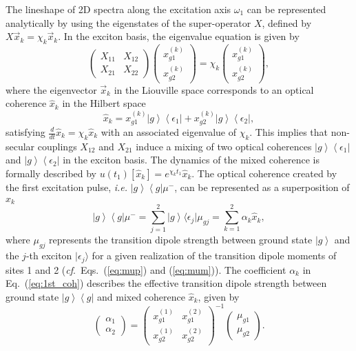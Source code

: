 \documentclass[%
 reprint,%
 amssymb, amsmath,%
 aip,cha,%
]{revtex4-1}
\newcommand{\bra}[1]{\ensuremath{\left\langle{#1}\right\vert}}
\newcommand{\ket}[1]{\ensuremath{\left|{#1}\right\rangle}}
\begin{document}
The lineshape of 2D spectra along the excitation axis $\omega_1$ can be represented analytically by using the eigenstates of the super-operator $X$, defined by $X\vec{x}_{k}=\chi_{k}\vec{x}_{k}$. In the exciton basis, the eigenvalue equation is given by
\begin{equation}
\begin{pmatrix}
	X_{11} & X_{12} \\ X_{21} & X_{22}
\end{pmatrix}
\begin{pmatrix}
	x_{g1}^{(k)} \\ x_{g2}^{(k)}
\end{pmatrix}
=\chi_{k}
\begin{pmatrix}
	x_{g1}^{(k)} \\ x_{g2}^{(k)}
\end{pmatrix},
\end{equation}
where the eigenvector $\vec{x}_{k}$ in the Liouville space corresponds to an optical coherence $\hat{x}_{k}$ in the Hilbert space
\begin{equation}
	\hat{x}_{k}=x_{g1}^{(k)}\ket{g}\bra{\epsilon_1}+x_{g2}^{(k)}\ket{g}\bra{\epsilon_2},
\end{equation}
satisfying $\frac{d}{dt}\hat{x}_{k}=\chi_{k}\hat{x}_{k}$ with an associated eigenvalue of $\chi_{k}$. This implies that non-secular couplings $X_{12}$ and $X_{21}$ induce a mixing of two optical coherences $\ket{g}\bra{\epsilon_1}$ and $\ket{g}\bra{\epsilon_2}$ in the exciton basis. The dynamics of the mixed coherence is formally described by $u(t_1)[\hat{x}_k]=e^{\chi_k t_1}\hat{x}_k$.  The optical coherence created by the first excitation pulse, {\it i.e.} $\ket{g}\bra{g}\mu^-$, can be represented as a superposition of $\hat{x}_k$
\begin{equation}
	\ket{g}\bra{g}\mu^{-}=\sum_{j=1}^{2}\ket{g}\mathrm{\langle}\epsilon_j\mathrm{|}\mu_{gj}=\sum_{k=1}^{2}\alpha_{k}\hat{x}_{k},
	\label{eq:1st_coh}
\end{equation}
where $\mu_{gj}$ represents the transition dipole strength between ground state $\ket{g}$ and the $j$-th exciton $\mathrm{|}\epsilon_j\mathrm{\rangle}$ for a given realization of the transition dipole moments of sites 1 and 2 ({\it cf}.~Eqs.~(\ref{eq:mup}) and (\ref{eq:mum})). The coefficient $\alpha_k$ in Eq.~(\ref{eq:1st_coh}) describes the effective transition dipole strength between ground state $\ket{g}\bra{g}$ and mixed coherence $\hat{x}_{k}$, given by
\begin{equation}
\begin{pmatrix}
	\alpha_{1} \\
	\alpha_{2}
\end{pmatrix}
=
\begin{pmatrix}
	x^{(1)}_{g1} & x^{(2)}_{g1} \\
	x^{(1)}_{g2} & x^{(2)}_{g2}
\end{pmatrix}^{-1}
\begin{pmatrix}
	\mu_{g1}\\
	\mu_{g2}
\end{pmatrix}.
\end{equation}
\end{document}
